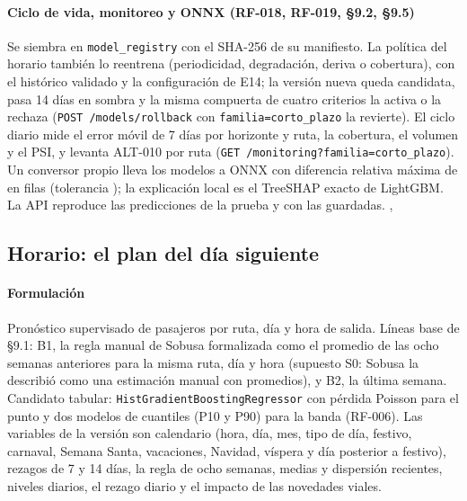 \documentclass[10pt,a4paper]{article}
\begin{document}
\paragraph{Ciclo de vida, monitoreo y ONNX (RF-018, RF-019, §9.2, §9.5)} Se siembra en \texttt{model\_registry} con el
SHA-256 de su manifiesto. La política del horario también lo reentrena (periodicidad, degradación, deriva o cobertura),
con el histórico validado y la configuración de E14; la versión nueva queda candidata, pasa 14 días en sombra y la
misma compuerta de cuatro criterios la activa o la rechaza (\texttt{POST /models/rollback} con
\texttt{familia=corto\_plazo} la revierte). El ciclo diario mide el error móvil de 7 días por horizonte y ruta, la
cobertura, el volumen y el PSI, y levanta ALT-010 por ruta (\texttt{GET /monitoring?familia=corto\_plazo}). Un
conversor propio lleva los \CortoArtefactos{} modelos a ONNX con diferencia relativa máxima de \CortoOnnxDifRel{} en
\CortoOnnxFilas{} filas (tolerancia \CortoOnnxTol); la explicación local es el TreeSHAP exacto de LightGBM. La API
reproduce las \CortoReproducidas{} predicciones de la prueba y \CortoReproduce{} con las guardadas.
, 

\subsection{Horario: el plan del día siguiente}
\paragraph{Formulación} Pronóstico supervisado de pasajeros por ruta, día y hora de salida. Líneas base de §9.1: B1,
la regla manual de Sobusa formalizada como el promedio de las ocho semanas anteriores para la misma ruta, día y hora
(supuesto S0: Sobusa la describió como una estimación manual con promedios), y B2, la última semana. Candidato tabular: \texttt{HistGradientBoostingRegressor} con pérdida Poisson para el punto y dos modelos de
cuantiles (P10 y P90) para la banda (RF-006). Las \NVariables{} variables de la versión \texttt{\FeatureVersion} son
calendario (hora, día, mes, tipo de día, festivo, carnaval, Semana Santa, vacaciones, Navidad, víspera y día posterior
a festivo), rezagos de 7 y 14 días, la regla de ocho semanas, medias y dispersión recientes, niveles diarios, el
rezago diario y el impacto de las novedades viales.
\end{document}
